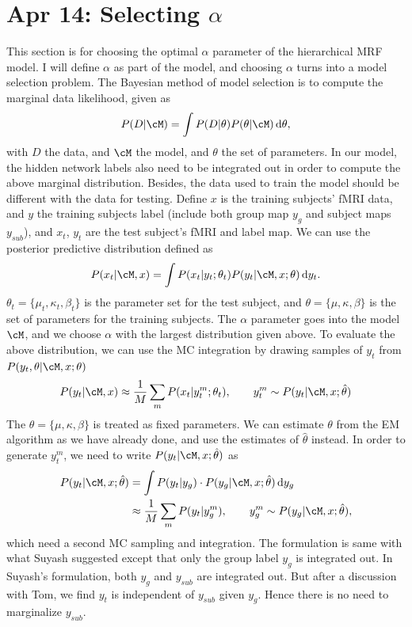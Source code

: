 \documentclass[12pt]{article}
\begin{document}
\section{Apr 14: Selecting $\alpha$}
This section is for choosing the optimal $\alpha$ parameter of the hierarchical
MRF model. I will define $\alpha$ as part of the model, and choosing $\alpha$
turns into a model selection problem. The Bayesian method of model selection is
to compute the marginal data likelihood, given as
\begin{align*}
  P(D | \cM) = \int P(D|\theta) P(\theta|\cM)\, \textrm{d}\theta,
\end{align*}
with $D$ the data, and $\cM$ the model, and $\theta$ the set of parameters. In
our model, the hidden network labels also need to be integrated out in order to
compute the above marginal distribution. Besides, the data used to train the
model should be different with the data for testing. Define $x$ is the training
subjects' fMRI data, and $y$ the training subjects label (include both group map
$y_g$ and subject maps $y_{sub}$), and $x_t$, $y_t$ are the test subject's fMRI
and label map. We can use the posterior predictive distribution defined as
\begin{align}
  P(x_t | \cM, x) = \int P(x_t | y_t; \theta_t) P(y_t| \cM, x; \theta)\, \textrm{d} y_t.
  \label{eq:predis}
\end{align}
$\theta_t = \{\mu_t, \kappa_t, \beta_t\}$ is the parameter set for the test
subject, and $\theta = \{\mu, \kappa, \beta\}$ is the set of parameters for the
training subjects. The $\alpha$ parameter goes into the model $\cM$, and we
choose $\alpha$ with the largest distribution given above. To evaluate the above
distribution, we can use the MC integration by drawing samples of $y_t$ from
$P(y_t, \theta|\cM, x; \theta)$
\begin{align*}
  P(y_t | \cM, x) \approx \frac{1}{M}\sum_m P(x_t|y_t^m; \theta_t), \qquad y_t^m \sim P(y_t|\cM, x; \hat \theta)
\end{align*}
 The $\theta = \{\mu, \kappa, \beta\}$ is treated as fixed parameters. We can
 estimate $\theta$ from the EM algorithm as we have already done, and use the
 estimates of $\hat \theta$ instead. In order to generate $y_t^m$, we need to
 write $P(y_t|\cM, x; \hat \theta)$ as
\begin{align}
P(y_t|\cM, x; \hat \theta) &= \int P(y_t | y_g) \cdot P(y_g |\cM, x; \hat \theta)\, \textrm{d} y_g \nonumber\\
&\approx \frac{1}{M}\sum_m P(y_t| y_g^m), \qquad y_g^m \sim P(y_g | \cM, x; \hat \theta),\label{eq:predapp}
\end{align}
which need a second MC sampling and integration. The formulation is same with
what Suyash suggested except that only the group label $y_g$ is integrated
out. In Suyash's formulation, both $y_g$ and $y_{sub}$ are integrated out. But
after a discussion with Tom, we find $y_t$ is independent of $y_{sub}$ given
$y_g$. Hence there is no need to marginalize $y_{sub}$. 
\end{document}
